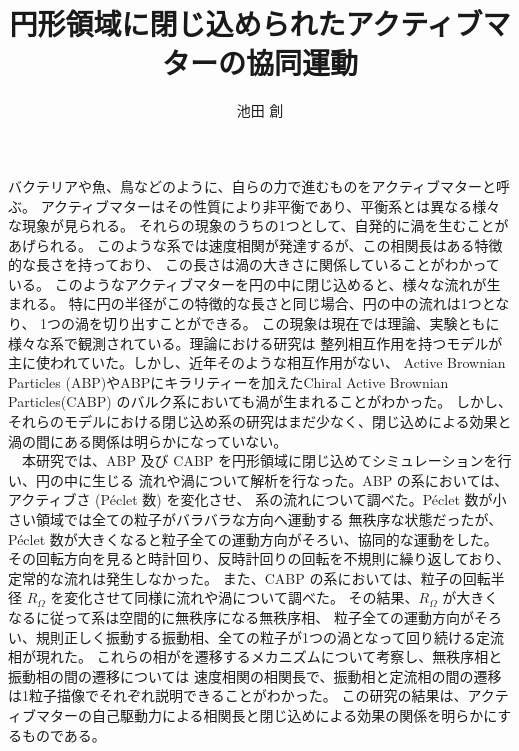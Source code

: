 \documentclass[a4paper]{jarticle}
\title{{\Large 円形領域に閉じ込められたアクティブマターの協同運動}}
\author{池田 創}
\date{}
\begin{document}
\maketitle
\thispagestyle{empty}
\normalsize
バクテリアや魚、鳥などのように、自らの力で進むものをアクティブマターと呼ぶ。
アクティブマターはその性質により非平衡であり、平衡系とは異なる様々な現象が見られる。
それらの現象のうちの1つとして、自発的に渦を生むことがあげられる。
このような系では速度相関が発達するが、この相関長はある特徴的な長さを持っており、
この長さは渦の大きさに関係していることがわかっている。
このようなアクティブマターを円の中に閉じ込めると、様々な流れが生まれる。
特に円の半径がこの特徴的な長さと同じ場合、円の中の流れは1つとなり、
1つの渦を切り出すことができる。
この現象は現在では理論、実験ともに様々な系で観測されている。理論における研究は
整列相互作用を持つモデルが主に使われていた。しかし、近年そのような相互作用がない、
Active Brownian Particles (ABP)やABPにキラリティーを加えたChiral Active Brownian Particles(CABP)
のバルク系においても渦が生まれることがわかった\cite{szamelLongrangedVelocityCorrelations2021,szamelLongrangedVelocityCorrelations2021,kurodaAnomalousFluctuationsHomogeneous2023,kurodaLongrangeTranslationalOrder2024}。
しかし、それらのモデルにおける閉じ込め系の研究はまだ少なく、閉じ込めによる効果と渦の間にある関係は明らかになっていない。\\
　本研究では、ABP 及び CABP を円形領域に閉じ込めてシミュレーションを行い、円の中に生じる
流れや渦について解析を行なった。ABP の系においては、アクティブさ (Péclet 数) を変化させ、
系の流れについて調べた。Péclet 数が小さい領域では全ての粒子がバラバラな方向へ運動する
無秩序な状態だったが、Péclet 数が大きくなると粒子全ての運動方向がそろい、協同的な運動をした。
その回転方向を見ると時計回り、反時計回りの回転を不規則に繰り返しており、定常的な流れは発生しなかった。
また、CABP の系においては、粒子の回転半径 $R_\Omega$ を変化させて同様に流れや渦について調べた。
その結果、$R_\Omega$ が大きくなるに従って系は空間的に無秩序になる無秩序相、
粒子全ての運動方向がそろい、規則正しく振動する振動相、全ての粒子が1つの渦となって回り続ける定流相が現れた。
これらの相がを遷移するメカニズムについて考察し、無秩序相と振動相の間の遷移については
速度相関の相関長で、振動相と定流相の間の遷移は1粒子描像でそれぞれ説明できることがわかった。
この研究の結果は、アクティブマターの自己駆動力による相関長と閉じ込めによる効果の関係を明らかにするものである。






\normalsize{
\printbibliography[title=参考文献]
}
\end{document}
